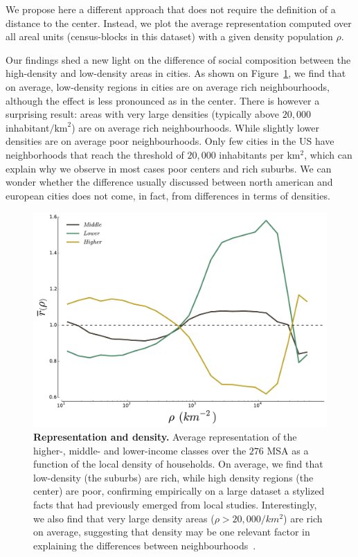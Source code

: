 We propose here a different approach that does not require the
definition of a distance to the center. Instead, we plot the average
representation computed over all areal units (census-blocks in this
dataset) with a given density population $\rho$.


Our findings shed a new light on the difference of social composition
between the high-density and low-density areas in cities. As shown on
Figure~\ref{fig:high_low_densities}, we find that on average,
low-density regions in cities are on average rich neighbourhoods,
although the effect is less pronounced as in the center. There is
however a surprising result: areas with very large densities
(typically above $20,000$ inhabitant$/\text{km}^2$) are on average
rich neighbourhoods. While slightly lower densities are on average poor
neighbourhoods. Only few cities in the US have neighborhoods that
reach the threshold of $20,000$ inhabitants per km$^2$, which can
explain why we observe in most cases poor centers and rich suburbs. We
can wonder whether the difference usually discussed between north
american and european cities does not come, in fact, from differences
in terms of densities. 

\begin{figure}
    \centering
    \includegraphics[width=\textwidth]{gfx/chapter-segregation/figure4.pdf}
    \caption{{\bf Representation and density.} Average representation of the higher-, middle- and
      lower-income classes over the $276$ MSA as a function of the
      local density of households. On average, we find that low-density (the
      suburbs) are rich, while high density regions (the center) are poor,
      confirming empirically on a large dataset a stylized facts that had previously
      emerged from local studies. Interestingly, we also
      find that  very large density areas ($\rho>20,000/km^2$) are rich on average,
      suggesting that density may be one relevant factor in explaining the
      differences between neighbourhoods~\cite{Jacobs:1961}.
      \label{fig:high_low_densities}
  } 
  \end{figure}


